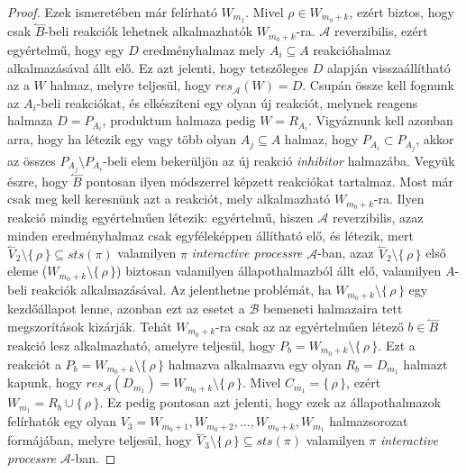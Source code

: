 \documentclass[12pt]{article}
\theoremstyle{definition}
\theoremstyle{remark}
\theoremstyle{plain}
\theoremstyle{plain}
\newcommand{\backwardhat}{\overset{\leftharpoonup}}
\newcommand{\res}{\textit{res}}
\begin{document}
\begin{proof}
            
        Ezek ismeretében már felírható $W_{m_{1}}$. Mivel $\rho \in W_{m_{0} + k}$, ezért biztos, hogy csak $\backwardhat B$-beli reakciók lehetnek alkalmazhatók $W_{m_{0} + k}$-ra. $\mathscr{A}$ reverzibilis, ezért egyértelmű, hogy egy $D$ eredményhalmaz mely $A_{i} \subseteq A$ reakcióhalmaz alkalmazásával állt elő. Ez azt jelenti, hogy tetszőleges $D$ alapján visszaállítható az a $W$ halmaz, melyre teljesül, hogy $\res_{\mathscr{A}}(W)=D$. Csupán össze kell fognunk az $A_{i}$-beli reakciókat, és elkészíteni egy olyan új reakciót, melynek reagens halmaza $D = P_{A_{i}}$, produktum halmaza pedig $W = R_{A_{i}}$. Vigyáznunk kell azonban arra, hogy ha létezik egy vagy több olyan $A_{j} \subseteq A$ halmaz, hogy $P_{A_{i}} \subset P_{A_{j}}$, akkor az összes $P_{A_{j}} \setminus P_{A_{i}}$-beli elem bekerüljön az új reakció \textit{inhibitor} halmazába. Vegyük észre, hogy $\backwardhat B$ pontosan ilyen módszerrel képzett reakciókat tartalmaz. Most már csak meg kell keresnünk azt a reakciót, mely alkalmazható $W_{m_{0} + k}$-ra. Ilyen reakció mindig egyértelműen létezik: egyértelmű, hiszen $\mathscr{A}$ reverzibilis, azaz minden eredményhalmaz csak egyféleképpen állítható elő, és létezik, mert $\backwardhat V_{2} \setminus \{ \, \rho \, \} \subseteq \textit{sts}(\pi)$ valamilyen $\pi$ \textit{interactive processre} $\mathscr{A}$-ban, azaz $\backwardhat V_{2} \setminus \{\,\rho\,\}$ első eleme ($W_{m_{0} + k} \setminus \{\,\rho\,\}$) biztosan valamilyen állapothalmazból állt elő, valamilyen $A$-beli reakciók alkalmazásával. Az jelenthetne problémát, ha $W_{m_{0} + k} \setminus \{\,\rho\,\}$ egy kezdőállapot lenne, azonban ezt az esetet a $\mathscr{B}$ bemeneti halmazaira tett megszorítások kizárják. %
        Tehát $W_{m_{0} + k}$-ra csak az az egyértelműen létező $b \in \backwardhat B$ reakció lesz alkalmazható, amelyre teljesül, hogy $P_{b} = W_{m_{0} + k} \setminus \{ \,  \rho \, \}$.  Ezt a reakciót a $P_{b} = W_{m_{0} + k} \setminus \{ \,  \rho \, \}$ halmazva alkalmazva egy olyan $R_{b} = D_{m_{1}}$ halmazt kapunk, hogy $\res_{\mathscr{A}}(D_{m_{1}}) = W_{m_{0} + k} \setminus \{ \,  \rho \, \}$. Mivel $C_{m_{1}} = \{\,\rho\,\}$, ezért $W_{m_{1}} = R_{b} \cup \{ \, \rho \, \}$. Ez pedig pontosan azt jelenti, hogy ezek az állapothalmazok felírhatók egy olyan $V_{3} = W_{m_{0} + 1}, W_{m_{0} + 2}, \ldots, W_{m_{0} + k}, W_{m_{1}}$ halmazsorozat formájában, melyre teljesül, hogy $\backwardhat V_{3} \setminus \{ \,  \rho \, \} \subseteq \textit{sts}(\pi)$ valamilyen $\pi$ \textit{interactive processre} $\mathscr{A}$-ban.


\end{proof}
\end{document}
